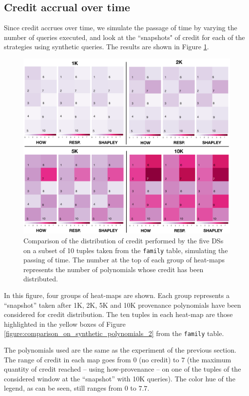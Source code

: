 \documentclass[preprint,12pt,sort&compress]{elsarticle}
\newcommand{\rone}[1]{\textcolor{reviewer1}{#1}}
\newcommand{\rtwo}[1]{\textcolor{reviewer2}{#1}}
\begin{document}

\subsection{Credit accrual over time} 
Since credit accrues over time, we simulate the passage of time by varying the number of queries executed, and look at the ``snapshots" of credit for each of the strategies using synthetic queries.  The results are shown in Figure \ref{fig:comparison}.

\begin{figure}[h!]
\centering
  \includegraphics[width=.60\textwidth]{comparison}
  \caption{\rtwo{Comparison of the distribution of credit performed by the \rtwo{five} DSs on a subset of 10 tuples taken from the \texttt{family} table, simulating the passing of time. The number at the top of each group of heat-maps represents the number of polynomials whose credit has been distributed.}}
  \label{fig:comparison}
\end{figure}

In this figure, four groups of heat-maps are shown. Each group represents a ``snapshot'' taken %
after 1K, 2K, 5K and 10K provenance polynomials have been considered for credit distribution.  
The ten tuples in each heat-map  %
are those  highlighted in the \rone{yellow} boxes of Figure \ref{figure:comparison_on_synthetic_polynomials_2} from the \texttt{family} table.  


The polynomials used are the same as the experiment of the previous section. The range of credit in each map goes from 0 (no credit) to $7$ (the maximum quantity of credit reached -- using how-provenance -- on one of the tuples of the considered window at the ``snapshot'' with 10K queries). The color hue of the legend, as can be seen, still ranges from $0$ to $7.7$.
\end{document}
